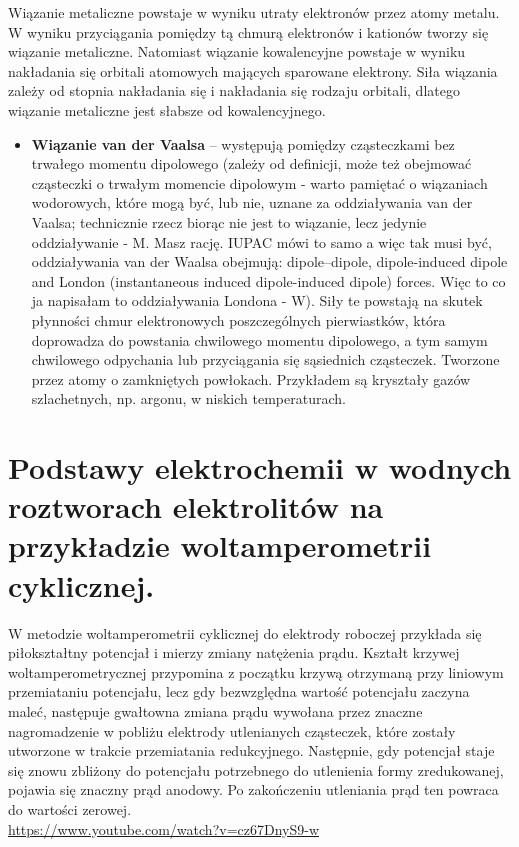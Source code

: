 \documentclass{article}
\begin{document}
Wiązanie metaliczne powstaje w wyniku utraty elektronów przez atomy metalu. W wyniku przyciągania pomiędzy tą chmurą elektronów i kationów tworzy się wiązanie metaliczne. Natomiast wiązanie kowalencyjne powstaje w wyniku nakładania się orbitali atomowych mających sparowane elektrony. Siła wiązania zależy od stopnia nakładania się i nakładania się rodzaju orbitali, dlatego wiązanie metaliczne jest słabsze od kowalencyjnego.
\begin{itemize}
\item \textbf{Wiązanie van der Vaalsa} -- występują pomiędzy cząsteczkami bez trwałego momentu dipolowego (zależy od definicji, może też obejmować cząsteczki o trwałym momencie dipolowym - warto pamiętać o wiązaniach wodorowych, które mogą być, lub nie, uznane za oddziaływania van der Vaalsa; technicznie rzecz biorąc nie jest to wiązanie, lecz jedynie oddziaływanie - M. Masz rację. IUPAC mówi to samo a więc tak musi być, oddziaływania van der Waalsa obejmują:  dipole–dipole, dipole-induced dipole and London (instantaneous induced dipole-induced dipole) forces. Więc to co ja napisałam to oddziaływania Londona - W). Siły te powstają na skutek płynności chmur elektronowych poszczególnych pierwiastków, która doprowadza do powstania chwilowego momentu dipolowego, a tym samym chwilowego odpychania lub przyciągania się sąsiednich cząsteczek. Tworzone przez atomy o zamkniętych powłokach. Przykładem są kryształy gazów szlachetnych, np. argonu, w niskich temperaturach. 
\end{itemize}
\section{Podstawy elektrochemii w wodnych roztworach elektrolitów na przykładzie
woltamperometrii cyklicznej.}

W metodzie woltamperometrii cyklicznej do elektrody roboczej przykłada się piłokształtny potencjał i mierzy zmiany natężenia prądu. Kształt krzywej woltamperometrycznej przypomina z początku krzywą otrzymaną przy liniowym przemiataniu potencjału, lecz gdy bezwzględna wartość potencjału zaczyna maleć, następuje gwałtowna zmiana prądu wywołana przez znaczne nagromadzenie w pobliżu elektrody utlenianych cząsteczek, które zostały utworzone w trakcie przemiatania redukcyjnego. Następnie, gdy potencjał staje się znowu zbliżony do potencjału potrzebnego do utlenienia formy zredukowanej, pojawia się znaczny prąd anodowy. Po zakończeniu utleniania prąd ten powraca do wartości zerowej.\\
\url{https://www.youtube.com/watch?v=cz67DnyS9-w}
\end{document}
